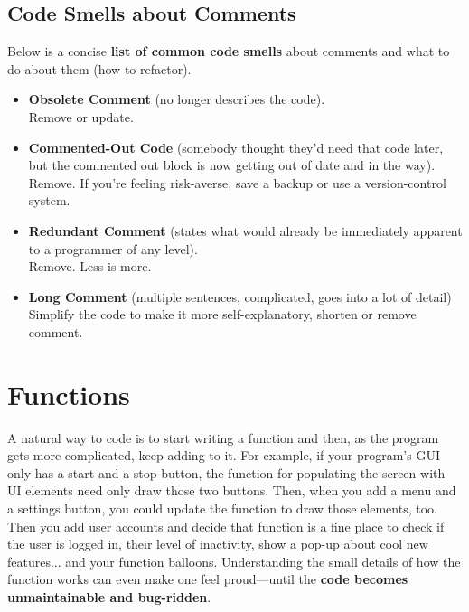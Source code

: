 \subsection{Code Smells about Comments}

Below is a concise \textbf{list of common code smells} about comments and what to do about them (how to refactor).\\

\begin{itemize}
\item {
\textbf{Obsolete Comment} (no longer describes the code).\\
Remove or update.
\spacer
}
\item {
\textbf{Commented-Out Code} (somebody thought they'd need that code later, but the commented out block is now getting out of date and in the way).\\
Remove. If you're feeling risk-averse, save a backup or use a version-control system.
\spacer
}
\item {
\textbf{Redundant Comment} (states what would already be immediately apparent to a programmer of any level).\\
Remove. Less is more.
\spacer
}
\item {
\textbf{Long Comment} (multiple sentences, complicated, goes into a lot of detail)\\
Simplify the code to make it more self-explanatory, shorten or remove comment.
\spacer
}
\end{itemize}

\section{Functions}

A natural way to code is to start writing a function and then, as the program gets more complicated, keep adding to it. For example, if your program's GUI only has a start and a stop button, the function for populating the screen with UI elements need only draw those two buttons. Then, when you add a menu and a settings button, you could update the function to draw those elements, too. Then you add user accounts and decide that function is a fine place to check if the user is logged in, their level of inactivity, show a pop-up about cool new features... and your function balloons. Understanding the small details of how the function works can even make one feel proud---until the \textbf{code becomes unmaintainable and bug-ridden}.  

